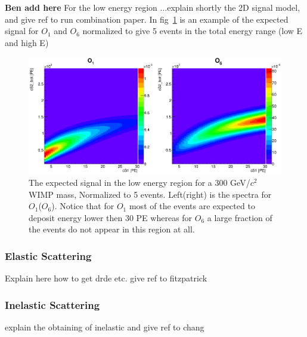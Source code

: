 \textbf{Ben add here} For the low energy region ...explain shortly the 2D signal model, and give ref to run combination paper. In fig~\ref{fig:LowE} is an example of the expected signal for $O_1$ and $O_6$ normalized to give 5 events in the total energy range (low E and high E)
\begin{figure}[h!]
\begin{minipage}{1.\linewidth}
\centerline{\includegraphics[width=1.\linewidth]{Figures/SigLowO1O6.eps}}
\end{minipage}
\caption{The expected signal in the low energy region for a 300 GeV/$c^2$ WIMP mass, Normalized to 5 events. Left(right) is the spectra for $O_1$($O_6$). Notice that for $O_1$ most of the events are expected to deposit energy lower then 30 PE whereas for $O_6$ a large fraction of the events do not appear in this region at all.}
\label{fig:LowE}
\end{figure}





\subsubsection{Elastic Scattering}
\label{subsubsec:Elastic}
Explain here how to get drde etc. give ref to fitzpatrick
\subsubsection{Inelastic Scattering}
\label{subsubsec:Inelastic}
explain the obtaining of inelastic and give ref to chang
